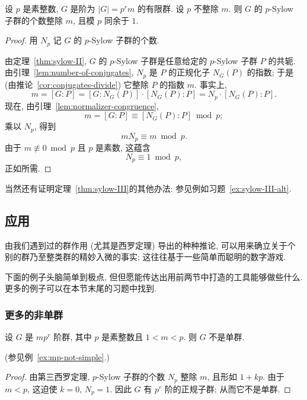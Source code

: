 \begin{theorem}[第三西罗定理]
\label{thm:sylow-III}
设 $p$ 是素整数, $G$ 是阶为 $|G| = p^r m$ 的有限群. 设 $p$ 不整除 $m$. 则 $G$ 的 $p$-Sylow 子群的个数整除 $m$, 且模 $p$ 同余于 $1$.
\end{theorem}

\begin{proof}
用 $N_p$ 记 $G$ 的 $p$-Sylow 子群的个数.

由定理~\ref{thm:sylow-II}, $G$ 的 $p$-Sylow 子群是任意给定的 $p$-Sylow 子群 $P$ 的共轭. 由引理~\ref{lem:number-of-conjugates}, $N_p$ 是 $P$ 的正规化子 $N_G(P)$ 的指数; 于是 (由推论~\ref{cor:conjugates-divide}) 它整除 $P$ 的指数 $m$. 事实上,
\[
m = [G:P] = [G:N_G(P)] \cdot [N_G(P):P] = N_p \cdot [N_G(P):P].
\]
现在, 由引理~\ref{lem:normalizer-congruence},
\[
m = [G:P] \equiv [N_G(P):P] \bmod p;
\]
乘以 $N_p$, 得到
\[
mN_p \equiv m \bmod p.
\]
由于 $m \not\equiv 0 \bmod p$ 且 $p$ 是素数, 这蕴含
\[
N_p \equiv 1 \bmod p,
\]
正如所需.
\end{proof}

当然还有证明定理~\ref{thm:sylow-III}的其他办法: 参见例如习题~\ref{ex:sylow-III-alt}.

\subsection{应用}
\label{subsec:sylow-applications}

由我们遇到过的群作用 (尤其是西罗定理) 导出的种种推论, 可以用来确立关于个别的群乃至整类群的精妙入微的事实; 这往往基于一些简单而聪明的数字游戏.

下面的例子头脑简单到极点, 但但愿能传达出用前两节中打造的工具能够做些什么. 更多的例子可以在本节末尾的习题中找到.

\subsubsection{更多的非单群}
\leavevmode{}\makeatletter{}\makeatother\label{subsec:more-nonsimple}

\begin{claim}
\label{claim:mpr-not-simple}
设 $G$ 是 $mp^r$ 阶群, 其中 $p$ 是素整数且 $1 < m < p$. 则 $G$ 不是单群.
\end{claim}

(参见例~\ref{ex:mp-not-simple}.)

\begin{proof}
由第三西罗定理, $p$-Sylow 子群的个数 $N_p$ 整除 $m$, 且形如 $1 + kp$. 由于 $m < p$, 这迫使 $k = 0$, $N_p = 1$. 因此 $G$ 有 $p^r$ 阶的正规子群; 从而它不是单群.
\end{proof}

